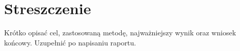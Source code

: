 \section*{Streszczenie}
Krótko opisać cel, zastosowaną metodę, najważniejszy wynik
oraz wniosek końcowy. Uzupełnić po napisaniu raportu.
